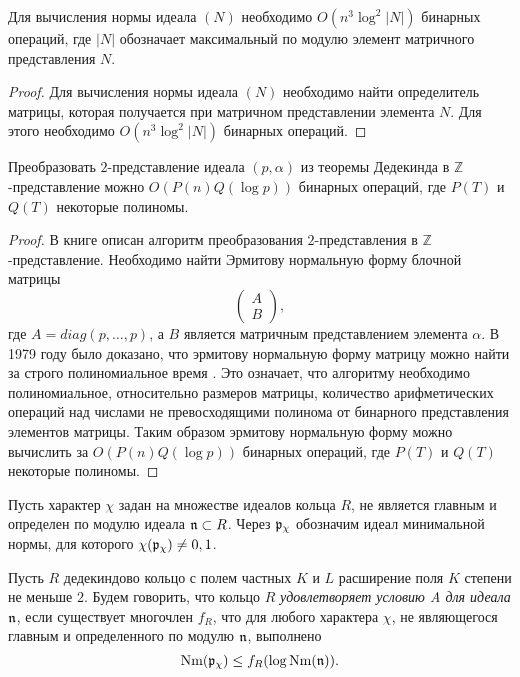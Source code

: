 \documentclass[_00_dissertation.tex]{subfiles}
\begin{document}
\begin{proposition}
    Для вычисления нормы идеала $(N)$ необходимо $O(n^3 \log^2 |N|)$ бинарных операций, где $|N|$ обозначает максимальный по модулю элемент матричного представления $N$.
\end{proposition}
\begin{proof}
    Для вычисления нормы идеала $(N)$ необходимо найти определитель матрицы, которая получается при матричном представлении элемента $N$.
    Для этого необходимо $O(n^3 \log^2 |N|)$ бинарных операций.
\end{proof}

\begin{proposition}
    Преобразовать $2$-представление идеала $(p, \alpha)$ из теоремы Дедекинда в $\mathbb{Z}$-представление можно $O(P(n)Q(\log p))$ бинарных операций, где $P(T)$ и $Q(T)$ некоторые полиномы.
\end{proposition}
\begin{proof}
    В книге \cite{Pohst} описан алгоритм преобразования $2$-представления в $\mathbb{Z}$-представление.
    Необходимо найти Эрмитову нормальную форму блочной матрицы
    \begin{equation*}
        \begin{pmatrix}
            A\\
            B
        \end{pmatrix},
    \end{equation*}
    где $A = diag(p, \dots, p)$, а $B$ является матричным представлением элемента $\alpha$.
    В 1979 году было доказано, что эрмитову нормальную форму матрицу можно найти за строго полиномиальное время \cite{Kannan}.
    Это означает, что алгоритму необходимо полиномиальное, относительно размеров матрицы, количество арифметических операций над числами не превосходящими полинома от бинарного представления элементов матрицы.
    Таким образом эрмитову нормальную форму можно вычислить за $O(P(n)Q(\log p))$ бинарных операций, где $P(T)$ и $Q(T)$ некоторые полиномы.
\end{proof}

\begin{definition}
    Пусть характер $\chi$ задан на множестве идеалов кольца $R$, не является главным и определен по модулю идеала $\mathfrak{n} \subset R$.
    Через $\mathfrak{p}_{\chi}$ обозначим идеал минимальной нормы, для которого $\chi(\mathfrak{p}_{\chi}) \neq 0, 1$.
\end{definition}

\begin{definition}
    Пусть $R$ дедекиндово кольцо с полем частных $K$ и $L$ расширение поля $K$ степени не меньше $2$.
    Будем говорить, что кольцо $R$ \emph{удовлетворяет условию A для идеала $\mathfrak{n}$}, если существует многочлен $f_R$, что для любого характера $\chi$, не являющегося главным и определенного по модулю $\mathfrak{n}$, выполнено
    \begin{equation*}
        \textrm{Nm}(\mathfrak{p}_{\chi}) \le f_R(\log{\textrm{Nm}(\mathfrak{n})}).
    \end{equation*}
\end{definition}
\end{document}
